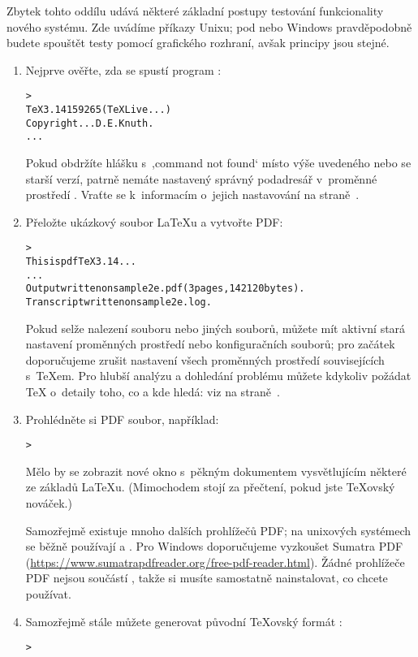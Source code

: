\documentclass[\classoptions,slovak,english,czech]{\classname}
\newcommand{\singleuv}[1]{,#1`}
\begin{document}
Zbytek tohto oddílu udává některé základní postupy testování funkcionality
nového systému. Zde uvádíme příkazy Unixu; pod
\MacOSX{} nebo Windows pravděpodobně budete spouštět testy pomocí
grafického rozhraní, avšak principy jsou stejné.

\begin{enumerate}
\item Nejprve ověřte, zda se spustí program :

\begin{alltt}
> 
TeX 3.14159265 (TeX Live ...)
Copyright ... D.E. Knuth.
...
\end{alltt}
Pokud obdržíte hlášku s~\singleuv{command not found} místo výše 
uvedeného nebo se starší verzí, patrně nemáte nastavený správný podadresář
 v~proměnné prostředí .  Vraťte se
k~informacím o~jejich nastavování na straně~\pageref{sec:env}.

\item Přeložte ukázkový soubor \LaTeX{}u a vytvořte PDF:
\begin{alltt}
> 
This is pdfTeX 3.14...
...
Output written on sample2e.pdf (3 pages, 142120 bytes).
Transcript written on sample2e.log.
\end{alltt}
Pokud selže nalezení souboru  nebo jiných
souborů, můžete mít aktivní stará nastavení proměnných prostředí nebo
konfiguračních souborů; pro začátek doporučujeme zrušit 
nastavení všech proměnných prostředí souvisejících s~\TeX{}em.
Pro hlubší analýzu a dohledání problému můžete kdykoliv požádat
\TeX{} o~detaily toho, co a kde hledá: viz 
na straně~\pageref{sec:debugging}.

\item Prohlédněte si PDF soubor, například:
\begin{alltt}
	> 
\end{alltt}
Mělo by se zobrazit nové okno s~pěkným dokumentem vysvětlujícím některé ze
základů \LaTeX{}u. (Mimochodem stojí za přečtení, pokud jste \TeX{}ovský nováček.)

Samozřejmě existuje mnoho dalších prohlížečů PDF; na unixových systémech se běžně používají
 a . Pro Windows doporučujeme vyzkoušet Sumatra PDF
(\url{https://www.sumatrapdfreader.org/free-pdf-reader.html}). Žádné prohlížeče PDF nejsou součástí \TL{}, takže si musíte samostatně nainstalovat, co chcete
používat.

\item Samozřejmě stále můžete generovat původní \TeX{}ovský formát \dvi{}:
\begin{alltt}
> 
\end{alltt}


\end{enumerate}
\end{document}
